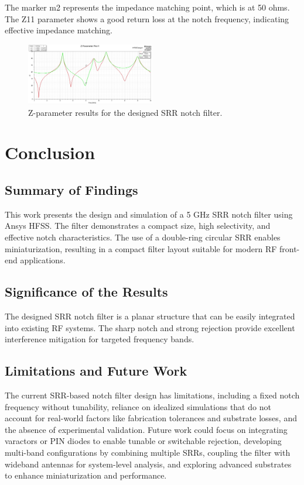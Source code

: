 \documentclass[conference]{IEEEtran}
\begin{document}
The marker m2 represents the impedance matching point, which is at 50 ohms. The Z11 parameter shows a good return loss at the notch frequency, indicating effective impedance matching. 

\begin{figure}[h]
\centering
    \includegraphics[width=0.5\textwidth]{Images/Final_Z_Param_Plot.jpg}
    \caption{Z-parameter results for the designed SRR notch filter.}
\end{figure}

\section{Conclusion}
\subsection{Summary of Findings}
This work presents the design and simulation of a 5 GHz SRR notch filter using Ansys HFSS. The filter demonstrates a compact size, high selectivity, and effective notch characteristics. The use of a double-ring circular SRR enables miniaturization, resulting in a compact filter layout suitable for modern RF front-end applications.

\subsection{Significance of the Results}
The designed SRR notch filter is a planar structure that can be easily integrated into existing RF systems. The sharp notch and strong rejection provide excellent interference mitigation for targeted frequency bands. 

\subsection{Limitations and Future Work}
The current SRR-based notch filter design has limitations, including a fixed notch frequency without tunability, reliance on idealized simulations that do not account for real-world factors like fabrication tolerances and substrate losses, and the absence of experimental validation. Future work could focus on integrating varactors or PIN diodes to enable tunable or switchable rejection, developing multi-band configurations by combining multiple SRRs, coupling the filter with wideband antennas for system-level analysis, and exploring advanced substrates to enhance miniaturization and performance.
\end{document}
